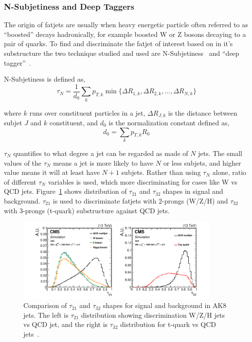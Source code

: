 \subsubsection{
  N-Subjetiness and Deep Taggers
}

The origin of fatjets are usually when heavy energetic particle
often referred to as ``boosted'' decays hadronically,
for example boosted W or Z bosons decaying to a pair of quarks.
To find and discriminate the fatjet of interest based on in it's substructure
the two technique studied and used are N-Subjetiness~\cite{tau21-paper}
and ``deep tagger''~\cite{cms-jme-deep-tagger}.

N-Subjetiness is defined as,
%
\begin{equation}
  \tau_N = \frac{1}{d_0} \sum_k p_{T,k} \min \{ \Delta R_{1,k}, \Delta R_{2,k}, \ldots , \Delta R_{N,k} \}
\end{equation}

where \( k \) runs over constituent particles in a jet, \( \Delta R_{J,k} \)
is the distance between subjet \( J \) and \( k \) constituent, and \( d_0 \)
is the normalization constant defined as,
%
\begin{equation}
  d_0 = \sum_k p_{T,k} R_0
\end{equation}

\( \tau_N \) quantifies to what degree a jet can be regarded as made of \( N \) jets.
The small values of the \( \tau_N \) means a jet is more likely to have
\( N \) or less subjets, and higher value means it will at least have \( N + 1\)
subjets. Rather than using \( \tau_N \) alone, ratio of different \( \tau_N \)
variables is used, which more discriminating for cases like W vs QCD jets.
Figure~\ref{fig:cms-tau21-tau32-comparison} shows distribution of
\( \tau_{21} \) and \( \tau_{32} \) shapes in signal and background.
\( \tau_{21} \) is used to discriminate fatjets with 2-prongs (W/Z/H)
and \( \tau_{32} \) with 3-prongs (t-quark) substructure against QCD jets.

\begin{figure}[!ht]
  \centering
  \includegraphics[width=0.9\textwidth]{figures/CMS_JME_18_002_Figure_003.pdf}
  \caption[Comparison of \( \tau_{21} \) and \( \tau_{32} \) shapes for signal and background in AK8 jets]%
  {Comparison of \( \tau_{21} \) and \( \tau_{32} \) shapes for signal and background in AK8 jets.
    The left is \( \tau_{21} \) distribution showing discrimination W/Z/H jets
    vs QCD jet, and the right is \( \tau_{32} \) distribution for t-quark vs
    QCD jets~\cite{cms-jme-deep-tagger}.}%
  \label{fig:cms-tau21-tau32-comparison}
\end{figure}


